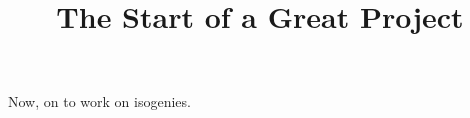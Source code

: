 \documentclass{article}
\title{The Start of a Great Project}
\date{}
\begin{document}
\maketitle

Now, on to work on isogenies.
\end{document}
